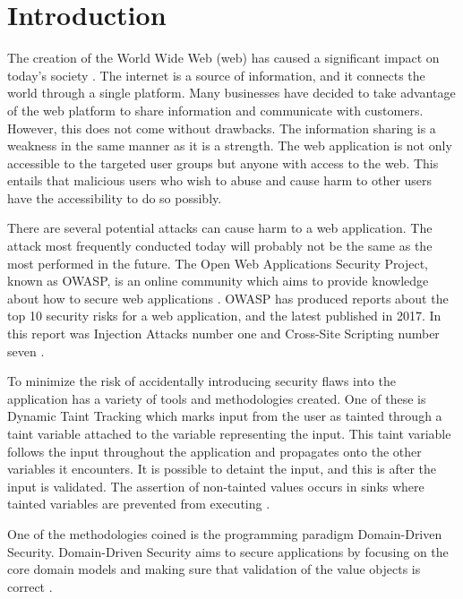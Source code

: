 \chapter{Introduction}
\label{Introduction}
The creation of the World Wide Web (web) has caused a significant impact on today's society \parencite{www}. The internet is a source of information, and it connects the world through a single platform. Many businesses have decided to take advantage of the web platform to share information and communicate with customers. However, this does not come without drawbacks. The information sharing is a weakness in the same manner as it is a strength. The web application is not only accessible to the targeted user groups but anyone with access to the web. This entails that malicious users who wish to abuse and cause harm to other users have the accessibility to do so possibly.

There are several potential attacks can cause harm to a web application. The attack most frequently conducted today will probably not be the same as the most performed in the future. The Open Web Applications Security Project, known as OWASP, is an online community which aims to provide knowledge about how to secure web applications \parencite{OpenWebApplicationSecurityProject}. OWASP has produced reports about the top 10 security risks for a web application, and the latest published in 2017. In this report was Injection Attacks number one and Cross-Site Scripting number seven \parencite{OWASP2017, OpenWebApplicationSecurityProject, CrossMichael2007Dgtw}.

To minimize the risk of accidentally introducing security flaws into the application has a variety of tools and methodologies created. One of these is Dynamic Taint Tracking which marks input from the user as tainted through a taint variable attached to the variable representing the input. This taint variable follows the input throughout the application and propagates onto the other variables it encounters. It is possible to detaint the input, and this is after the input is validated. The assertion of non-tainted values occurs in sinks where tainted variables are prevented from executing \parencite{Pan2015, Venkataramani2008}. 

One of the methodologies coined is the programming paradigm Domain-Driven Security. Domain-Driven Security aims to secure applications by focusing on the core domain models and making sure that validation of the value objects is correct \parencite{Wilander2009, Johnsson2009}.

